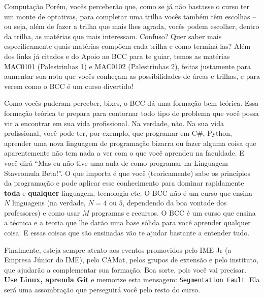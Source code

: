 \begin{subsecao}{Computação}
Porém, vocês perceberão que, como se já não bastasse o curso ter um monte de
optativas, para completar uma trilha vocês também têm escolhas -- ou seja,
além de fazer a trilha que mais lhes agrada, vocês podem escolher, dentro da
trilha, as matérias que mais interessam. Confuso? Quer saber mais
especificamente quais matérias compõem cada trilha e como terminá-las? Além
dos links já citados e do Apoio ao BCC para te guiar, temos as matérias MAC0101
(Palestrinhas 1) e MAC0102 (Palestrinhas 2), feitas justamente para
\sout{aumentar sua nota} que vocês conheçam as possibilidades de áreas e
trilhas, e para verem como o BCC é um curso divertido!

Como vocês puderam perceber, bixes, o BCC dá uma formação bem teórica. Essa
formação teórica te prepara para contornar todo tipo de problema que você
possa vir a encontrar em sua vida profissional. Na verdade, não. Na sua vida
profissional, você pode ter, por exemplo, que programar em C\#, Python,
aprender uma nova linguagem de programação bizarra ou fazer alguma coisa que
aparentemente não tem nada a ver com o que você aprendeu na faculdade. E você
dirá ``Mas eu não tive uma aula de como programar na Linguagem Stavromula
Beta!''. O que importa é que você (teoricamente) sabe os princípios da
programação e pode aplicar esse conhecimento para dominar rapidamente \textbf{toda}
e \textbf{qualquer} linguagem, tecnologia etc. O BCC não é um curso que ensina $N$
linguagens (na verdade, $N = 4$ ou $5$, dependendo da boa vontade dos
professores) e como usar $M$ programas e recursos. O BCC é um curso que ensina
a técnica e a teoria que lhe darão uma base sólida para você aprender qualquer
coisa. E essas coisas que são ensinadas vão te ajudar bastante a entender tudo.

Finalmente, esteja sempre atento aos eventos promovidos pelo IME Jr (a Empresa Júnior do IME),
pelo CAMat, pelos grupos de extensão e pelo instituto, que ajudarão a
complementar sua formação. Boa sorte, pois você vai precisar. \textbf{Use
Linux, aprenda Git} e memorize esta mensagem: \texttt{Segmentation Fault}. Ela será
uma assombração que perseguirá você pelo resto do curso.


\end{subsecao}
